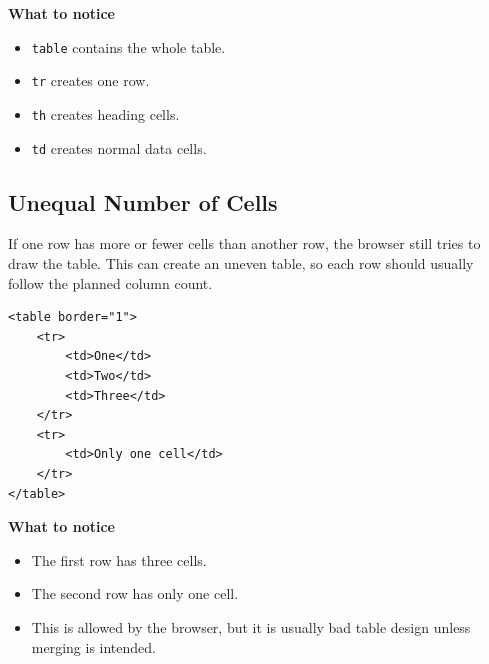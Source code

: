 \textbf{What to notice}
\begin{itemize}
    \item \texttt{table} contains the whole table.
    \item \texttt{tr} creates one row.
    \item \texttt{th} creates heading cells.
    \item \texttt{td} creates normal data cells.
\end{itemize}

\subsection{Unequal Number of Cells}
If one row has more or fewer cells than another row, the browser still tries to draw the table. This can create an uneven table, so each row should usually follow the planned column count.

\begin{lstlisting}[style=htmlide, caption={Unequal Table Cells}]
<table border="1">
    <tr>
        <td>One</td>
        <td>Two</td>
        <td>Three</td>
    </tr>
    <tr>
        <td>Only one cell</td>
    </tr>
</table>
\end{lstlisting}

\textbf{What to notice}
\begin{itemize}
    \item The first row has three cells.
    \item The second row has only one cell.
    \item This is allowed by the browser, but it is usually bad table design unless merging is intended.
\end{itemize}

